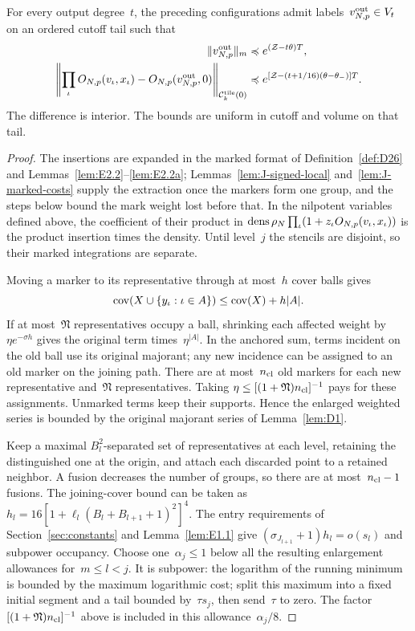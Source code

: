 \begin{lemma}\label{lem:J-lattice}
For every output degree~$t$, the preceding configurations admit labels~$v_{N,p}^{\rm out}\in V_t$ on an ordered cutoff tail such that
\begin{align*}
\|v_{N,p}^{\rm out}\|_m&\preccurlyeq e^{(\mathcal Z-t\theta)T},\\
\left\|\prod_\iota O_{N,p}(v_\iota,x_\iota)-O_{N,p}(v_{N,p}^{\rm out},0)\right\|_{\mathcal C^{\rm tile}_k(0)}
&\preccurlyeq e^{[\mathcal Z-(t+1/16)(\theta-\theta_-)]T}.
\end{align*}
The difference is interior. The bounds are uniform in cutoff and volume on that tail.
\end{lemma}
\begin{proof}\label{proof:J-lattice-start}
The insertions are expanded in the marked format of Definition~\ref{def:D26} and Lemmas~\ref{lem:E2.2}--\ref{lem:E2.2a}; Lemmas~\ref{lem:J-signed-local} and~\ref{lem:J-marked-costs} supply the extraction once the markers form one group, and the steps below bound the mark weight lost before that. In the nilpotent variables defined above, the coefficient of their product in $\operatorname{dens}\rho_N\prod_\iota(1+z_\iota O_{N,p}(v_\iota,x_\iota))$ is the product insertion times the density. Until level~$j$ the stencils are disjoint, so their marked integrations are separate.

Moving a marker to its representative through at most~$h$ cover balls gives
\begin{equation}\label{eq:J-support-move}
\operatorname{cov}(X\cup\{y_\iota:\iota\in A\})\le\operatorname{cov}(X)+h|A|.
\end{equation}
If at most~$\mathfrak N$ representatives occupy a ball, shrinking each affected weight by $\eta e^{-\sigma h}$ gives the original term times~$\eta^{|A|}$. In the anchored sum, terms incident on the old ball use its original majorant; any new incidence can be assigned to an old marker on the joining path. There are at most~$n_{\rm cl}$ old markers for each new representative and~$\mathfrak N$ representatives. Taking $\eta\le[(1+\mathfrak N)n_{\rm cl}]^{-1}$ pays for these assignments. Unmarked terms keep their supports. Hence the enlarged weighted series is bounded by the original majorant series of Lemma~\ref{lem:D1}.

Keep a maximal $B_l^2$-separated set of representatives at each level, retaining the distinguished one at the origin, and attach each discarded point to a retained neighbor. A fusion decreases the number of groups, so there are at most~$n_{\rm cl}-1$ fusions. The joining-cover bound can be taken as
$h_l=16[1+\ell_l(B_l+B_{l+1}+1)^2]^4$.
The entry requirements of Section~\ref{sec:constants} and Lemma~\ref{lem:E1.1} give $(\sigma_{J_{l+1}}+1)h_l=o(s_l)$ and subpower occupancy. Choose one~$\alpha_j\le1$ below all the resulting enlargement allowances for~$m\le l<j$. It is subpower: the logarithm of the running minimum is bounded by the maximum logarithmic cost; split this maximum into a fixed initial segment and a tail bounded by~$\tau s_j$, then send~$\tau$ to zero. The factor~$[(1+\mathfrak N)n_{\rm cl}]^{-1}$ above is included in this allowance~$\alpha_j/8$.


\end{proof}

